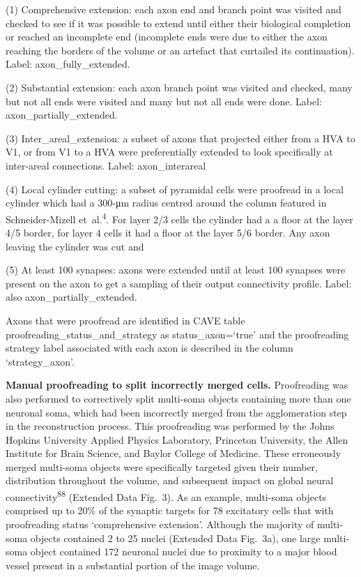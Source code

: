 \documentclass{article}
\begin{document}
\begin{hangpars}
(1) Comprehensive extension: each axon end and branch point was visited and checked to see if it was possible to extend until either their biological completion or reached an incomplete end (incomplete ends were due to either the axon reaching the borders of the volume or an artefact that curtailed its continuation). Label: axon\_fully\_extended.

(2) Substantial extension: each axon branch point was visited and checked, many but not all ends were visited and many but not all ends were done. Label: axon\_partially\_extended.

(3) Inter\_areal\_extension: a subset of axons that projected either from a HVA to V1, or from V1 to a HVA were preferentially extended to look specifically at inter-areal connections. Label: axon\_interareal

(4) Local cylinder cutting: a subset of pyramidal cells were proofread in a local cylinder which had a 300-μm radius centred around the column featured in Schneider-Mizell et~al.\textsuperscript{4}. For layer 2/3 cells the cylinder had a a floor at the layer 4/5 border, for layer 4 cells it had a floor at the layer 5/6 border. Any axon leaving the cylinder was cut and

(5) At least 100 synapses: axons were extended until at least 100 synapses were present on the axon to get a sampling of their output connectivity profile. Label: also axon\_partially\_extended.
\end{hangpars}

Axons that were proofread are identified in CAVE table proofreading\_status\_and\_strategy as status\_axon=‘true’ and the proofreading strategy label associated with each axon is described in the column ‘strategy\_axon’.

\textbf{Manual proofreading to split incorrectly merged cells.} Proofreading was also performed to correctively split multi-soma objects containing more than one neuronal soma, which had been incorrectly merged from the agglomeration step in the reconstruction process. This proofreading was performed by the Johns Hopkins University Applied Physics Laboratory, Princeton University, the Allen Institute for Brain Science, and Baylor College of Medicine. These erroneously merged multi-soma objects were specifically targeted given their number, distribution throughout the volume, and subsequent impact on global neural connectivity\textsuperscript{88} (Extended Data Fig.~3). As an example, multi-soma objects comprised up to 20\% of the synaptic targets for 78 excitatory cells that with proofreading status ‘comprehensive extension’. Although the majority of multi-soma objects contained 2 to 25 nuclei (Extended Data Fig.~3a), one large multi-soma object contained 172 neuronal nuclei due to proximity to a major blood vessel present in a substantial portion of the image volume.
\end{document}
